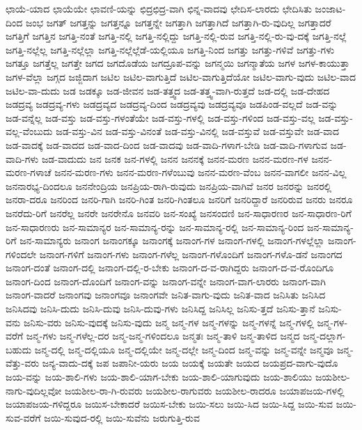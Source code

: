 {ಛಾಯೆ-ಯಾದ
ಛಾಯೆಯೇ
ಛಾವಣಿ-ಯನ್ನು
ಛಿದ್ರಛಿದ್ರ-ವಾಗಿ
ಛಿನ್ನ-ವಾದವು
ಛೇದಿಸ-ಲಾರದು
ಛೇದಿಸಿತು
ಜಂಜಾಟ-ದಿಂದ
ಜಂಭ
ಜಗತ್
ಜಗತ್ತನ್ನು
ಜಗತ್ತನ್ನೂ
ಜಗತ್ತನ್ನೇ
ಜಗತ್ತಾಗಿ
ಜಗತ್ತಾಗಿದೆ
ಜಗತ್ತಾಗಿ-ರು-ವುದಿಲ್ಲ
ಜಗತ್ತಾದರೆ
ಜಗತ್ತಿಗೆ
ಜಗತ್ತಿನ
ಜಗತ್ತಿ-ನಂತೆ
ಜಗತ್ತಿ-ನಲ್ಲಿ
ಜಗತ್ತಿ-ನಲ್ಲಿದ್ದು
ಜಗತ್ತಿ-ನಲ್ಲಿ-ರುವ
ಜಗತ್ತಿ-ನಲ್ಲಿ-ರು-ವು-ದಕ್ಕೆ
ಜಗತ್ತಿ-ನಲ್ಲೆ
ಜಗತ್ತಿ-ನಲ್ಲೆಲ್ಲ
ಜಗತ್ತಿ-ನಲ್ಲೆಲ್ಲಾ
ಜಗತ್ತಿ-ನಲ್ಲೆಲ್ಲೆಡೆ-ಯಲ್ಲಿಯೂ
ಜಗತ್ತಿ-ನಿಂದ
ಜಗತ್ತು
ಜಗತ್ತು-ಗಳಿವೆ
ಜಗತ್ತು-ಗಳು
ಜಗತ್ತೂ
ಜಗತ್ತೆಲ್ಲ
ಜಗತ್ತೇ
ಜಗದ
ಜಗದೊಡೆಯ
ಜಗದ್ರೂಪ-ವನ್ನು
ಜಗನ್ಮಯಿ
ಜಗನ್ಮಾತೆಯ
ಜಗಳ
ಜಗಳ-ಕಾಯುತ್ತಾ
ಜಗಳ-ವೆಲ್ಲಾ
ಜಗ್ಗದ
ಜಜ್ಜಿದಾಗ
ಜಟಿಲ
ಜಟಿಲ-ವಾಗುತ್ತಿದೆ
ಜಟಿಲ-ವಾಗುತ್ತಿದೆಯೋ
ಜಟಿಲ-ವಾಗು-ವುದು
ಜಟಿಲ-ವಾದ
ಜಟಿಲ-ವಾ-ದುದು
ಜಡ
ಜಡಕ್ಕೂ
ಜಡ-ಜೀವನ
ಜಡ-ತತ್ತ್ವದ
ಜಡ-ತತ್ತ್ವ-ವಾಗಿ-ರುತ್ತದೆ
ಜಡ-ದಲ್ಲಿ
ಜಡ-ದೇಹದ
ಜಡದ್ರವ್ಯ
ಜಡದ್ರವ್ಯ-ಗಳು
ಜಡದ್ರವ್ಯದ
ಜಡದ್ರವ್ಯ-ದಿಂದ
ಜಡದ್ರವ್ಯವು
ಜಡದ್ರವ್ಯವೂ
ಜಡಪಿಂಡ-ವಲ್ಲದೆ
ಜಡ-ವನ್ನು
ಜಡ-ವನ್ನೆಲ್ಲ
ಜಡ-ವಸ್ತು
ಜಡ-ವಸ್ತು-ಗಳಂತೆಯೇ
ಜಡ-ವಸ್ತು-ಗಳಲ್ಲಿ
ಜಡ-ವಸ್ತು-ಗಳಿಂದ
ಜಡ-ವಸ್ತು-ವಲ್ಲ
ಜಡ-ವಸ್ತು-ವಲ್ಲ-ವೆಂಬುದು
ಜಡ-ವಸ್ತು-ವಿನ
ಜಡ-ವಸ್ತು-ವಿನಂತೆ
ಜಡ-ವಸ್ತು-ವಿನಲ್ಲಿ
ಜಡ-ವಸ್ತುವೆ
ಜಡ-ವಸ್ತುವೇ
ಜಡ-ವಾದ
ಜಡ-ವಾದಕ್ಕೆ
ಜಡ-ವಾದದ
ಜಡ-ವಾದ-ದಿಂದ
ಜಡ-ವಾದವು
ಜಡ-ವಾದಿ-ಗಳಾಗ-ಬೇಡಿ
ಜಡ-ವಾದಿ-ಗಳಾಗುವ
ಜಡ-ವಾದಿ-ಗಳು
ಜಡ-ವಾದುದು
ಜನ
ಜನಕ
ಜನ-ಗಳಲ್ಲಿ
ಜನನ
ಜನನಕ್ಕೆ
ಜನನ-ಮರಣ
ಜನನ-ಮರಣ-ಗಳ
ಜನನ-ಮರಣ-ಗಳಾಚೆ
ಜನನ-ಮರಣ-ಗಳು
ಜನನ-ಮರಣ-ಗಳೆಂಬುವು
ಜನನ-ಮರಣ-ವೆಂಬ
ಜನನ-ವಾಗಲೀ
ಜನನ-ವಿಲ್ಲ
ಜನನಾರಭ್ಯ-ದಿಂದಲೂ
ಜನನೇಂದ್ರಿಯ
ಜನಪ್ರಿಯ-ರಾಗಿ-ರುವುದು
ಜನಪ್ರಿಯ-ವಾಗಿವೆ
ಜನರ
ಜನರನ್ನು
ಜನರಲ್ಲಿ
ಜನರಾ-ದರೂ
ಜನರಿಂದ
ಜನರಿ-ಗಾಗಿ
ಜನರಿ-ಗಿಂತ
ಜನರಿ-ಗಿಂತಲೂ
ಜನರಿಗೆ
ಜನರಿದ್ದಾರೆ
ಜನರಿರುವ
ಜನರು
ಜನರೂ
ಜನರೆದು-ರಿಗೆ
ಜನರೆಲ್ಲ
ಜನರೇ
ಜನರೇನೊ
ಜನವರಿ
ಜನ-ಸಂಖ್ಯೆ
ಜನಸಂದಣಿ
ಜನ-ಸಾಧಾರಣರ
ಜನ-ಸಾಧಾರಣ-ರಿಗೆ
ಜನ-ಸಾಧಾರಣರು
ಜನ-ಸಾಮಾನ್ಯರ
ಜನ-ಸಾಮಾನ್ಯ-ರನ್ನು
ಜನ-ಸಾಮಾನ್ಯ-ರಲ್ಲಿ
ಜನ-ಸಾಮಾನ್ಯ-ರಿಂದ
ಜನ-ಸಾಮಾನ್ಯ-ರಿಗೆ
ಜನ-ಸಾಮಾನ್ಯರು
ಜನಾಂಗ
ಜನಾಂಗಕ್ಕೂ
ಜನಾಂಗಕ್ಕೆ
ಜನಾಂಗ-ಗಳ
ಜನಾಂಗ-ಗಳಲ್ಲಿ
ಜನಾಂಗ-ಗಳಲ್ಲೆಲ್ಲಾ
ಜನಾಂಗ-ಗಳಿಂದಲೇ
ಜನಾಂಗ-ಗಳಿಗೆ
ಜನಾಂಗ-ಗಳು
ಜನಾಂಗ-ಗಳೆಲ್ಲ
ಜನಾಂಗ-ಗಳೊಂದಿಗೆ
ಜನಾಂಗ-ಗಳೊ-ಡನೆ
ಜನಾಂಗದ
ಜನಾಂಗ-ದಂತೆ
ಜನಾಂಗ-ದಲ್ಲಿ
ಜನಾಂಗ-ದಲ್ಲಿ-ರ-ಬೇಕು
ಜನಾಂಗ-ದ-ವ-ರಾಗಿದ್ದರು
ಜನಾಂಗ-ದ-ವ-ರೊಂದಿಗೂ
ಜನಾಂಗ-ದಿಂದ
ಜನಾಂಗ-ದೊಂದಿಗೆ
ಜನಾಂಗ-ವನ್ನು
ಜನಾಂಗ-ವನ್ನೇ
ಜನಾಂಗ-ವಾಗ-ಲಾರರು
ಜನಾಂಗ-ವಾಗಿ
ಜನಾಂಗ-ವಾದರೆ
ಜನಾಂಗವು
ಜನಾಂಗವೂ
ಜನಾಂಗವೇ
ಜನಿತ-ವಾಗು-ವುದು
ಜನಿತ-ವಾದ
ಜನಿಸಿತು
ಜನಿಸಿದ
ಜನಿಸಿದವು
ಜನಿಸಿ-ದುದು
ಜನಿಸಿ-ದುವು
ಜನಿಸಿ-ದುವು-ಗಳು
ಜನಿಸಿದ್ದ
ಜನಿಸಿಲ್ಲ
ಜನಿಸು-ತ್ತದೆ
ಜನಿಸು-ತ್ತಾನೆ
ಜನಿಸು-ವನು
ಜನಿಸು-ವರು
ಜನಿಸು-ವುದಕ್ಕೆ
ಜನಿಸು-ವುದು
ಜನ್ಮ
ಜನ್ಮ-ಗಳ
ಜನ್ಮ-ಗಳನ್ನು
ಜನ್ಮ-ಗಳನ್ನೆ
ಜನ್ಮ-ಗಳಲ್ಲಿ
ಜನ್ಮ-ಗಳ-ವರೆಗೆ
ಜನ್ಮ-ಗಳು
ಜನ್ಮ-ಗಳೆಲ್ಲ-ದರ
ಜನ್ಮ-ಜನ್ಮ-ಗಳಿಂದಲೂ
ಜನ್ಮತಃ
ಜನ್ಮ-ತಾಳಿ
ಜನ್ಮ-ತಾಳಿದ
ಜನ್ಮದ
ಜನ್ಮ-ದಲ್ಲಾಗ-ಬಹುದು
ಜನ್ಮ-ದಲ್ಲಿ
ಜನ್ಮ-ದಲ್ಲಿಯೂ
ಜನ್ಮ-ದಲ್ಲಿಯೇ
ಜನ್ಮ-ದಲ್ಲೇ
ಜನ್ಮ-ದಿಂದ
ಜನ್ಮ-ವನ್ನು
ಜನ್ಮ-ವನ್ನೇ
ಜನ್ಮವೂ
ಜನ್ಮ-ವೆತ್ತು-ವರು
ಜನ್ಯ-ವಾದು-ದಕ್ಕೆ
ಜಪ
ಜಪಾನೀ-ಯರು
ಜಯ
ಜಯಕ್ಕೆ
ಜಯತೇ
ಜಯದ
ಜಯಪ್ರದ-ವಾಗು-ವುದೊ
ಜಯ-ವನ್ನು
ಜಯ-ಶಾಲಿ-ಗಳು
ಜಯ-ಶಾಲಿ-ಯಾಗ-ಬೇಕು
ಜಯ-ಶಾಲಿ-ಯಾಗುವುದು
ಜಯ-ಶಾಲಿಯು
ಜಯಶೀಲ-ನಾಗು-ವುದಿಲ್ಲವೋ
ಜಯಶೀಲ-ರಾ-ಗಿ-ರುವರು
ಜಯಶೀಲ-ರಾಗುವರು
ಜಯಶೀಲ-ರಾದರೂ
ಜಯಾಪಜಯ-ಗಳಲ್ಲಿ
ಜಯಾಪಜಯ-ಗಳಿದ್ದರೂ
ಜಯಿಸ-ಬೇಕಾದರೆ
ಜಯಿಸ-ಬೇಕು
ಜಯಿ-ಸಲು
ಜಯಿ-ಸಿದ
ಜಯಿ-ಸಿದ್ದ
ಜಯಿ-ಸುವ
ಜಯಿ-ಸುವ-ವರೆಗೆ
ಜಯಿ-ಸುವುದ-ರಲ್ಲಿ
ಜಯಿ-ಸುವೆನು
ಜರುಗುತ್ತಿ-ರುವ
}
